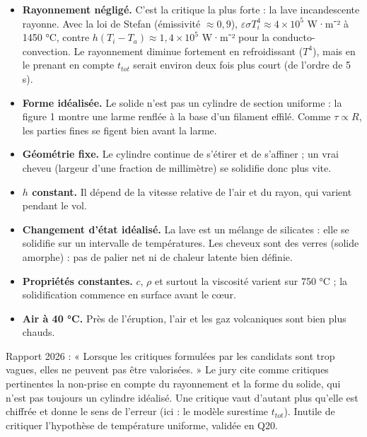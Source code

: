 \documentclass[11pt,a4paper]{article}
\providecommand{\tightlist}{\setlength{\itemsep}{0pt}\setlength{\parskip}{0pt}}
\begin{document}
\begin{itemize}
\tightlist
\item
  \textbf{Rayonnement négligé.} C'est la critique la plus forte : la lave incandescente rayonne. Avec la loi de Stefan (émissivité \(\approx 0{,}9\)), \(\varepsilon\sigma T_i^4 \approx 4\times10^5\) W·m⁻² à 1450 °C, contre \(h(T_i - T_a) \approx 1{,}4\times10^5\) W·m⁻² pour la conducto-convection. Le rayonnement diminue fortement en refroidissant (\(T^4\)), mais en le prenant en compte \(t_{tot}\) serait environ deux fois plus court (de l'ordre de 5 s).
\item
  \textbf{Forme idéalisée.} Le solide n'est pas un cylindre de section uniforme : la figure 1 montre une larme renflée à la base d'un filament effilé. Comme \(\tau \propto R\), les parties fines se figent bien avant la larme.
\item
  \textbf{Géométrie fixe.} Le cylindre continue de s'étirer et de s'affiner ; un vrai cheveu (largeur d'une fraction de millimètre) se solidifie donc plus vite.
\item
  \textbf{\(h\) constant.} Il dépend de la vitesse relative de l'air et du rayon, qui varient pendant le vol.
\item
  \textbf{Changement d'état idéalisé.} La lave est un mélange de silicates : elle se solidifie sur un intervalle de températures. Les cheveux sont des verres (solide amorphe) : pas de palier net ni de chaleur latente bien définie.
\item
  \textbf{Propriétés constantes.} \(c\), \(\rho\) et surtout la viscosité varient sur 750 °C ; la solidification commence en surface avant le cœur.
\item
  \textbf{Air à 40 °C.} Près de l'éruption, l'air et les gaz volcaniques sont bien plus chauds.
\end{itemize}

\begin{jury}

Rapport 2026 : « Lorsque les critiques formulées par les candidats sont trop vagues, elles ne peuvent pas être valorisées. » Le jury cite comme critiques pertinentes la non-prise en compte du rayonnement et la forme du solide, qui n'est pas toujours un cylindre idéalisé. Une critique vaut d'autant plus qu'elle est chiffrée et donne le sens de l'erreur (ici : le modèle surestime \(t_{tot}\)). Inutile de critiquer l'hypothèse de température uniforme, validée en Q20.

\end{jury}
\end{document}
